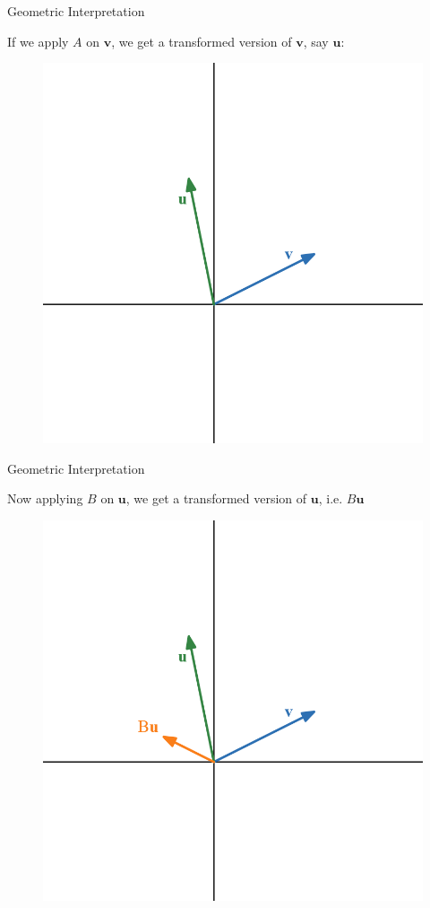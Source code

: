 \documentclass{beamer}
\begin{document}
\begin{frame}{Geometric Interpretation }

If we apply $A$ on $\mathbf{v} $, we get a transformed version of $\mathbf{v} $, say $\mathbf{u}$:

\begin{figure}
    \centering
    \includegraphics[width=0.5\linewidth]{matrix product/desmos-graph (3).png}
\end{figure}    
\end{frame}



\begin{frame}{Geometric Interpretation }

Now  applying $B$ on $\mathbf{u} $, we get a  transformed version of $\mathbf{u} $, i.e. $B\mathbf{u}$

\begin{figure}
    \centering
    \includegraphics[width=0.5\linewidth]{matrix product/desmos-graph (4).png}
\end{figure}    
\end{frame}
\end{document}
